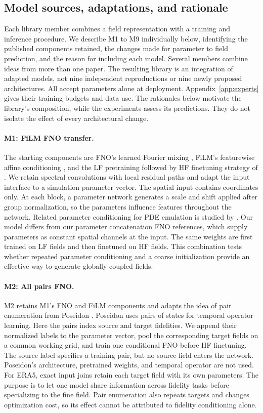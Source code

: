 \subsection{Model sources, adaptations, and rationale}
\label{app:adaptations}
Each library member combines a field representation with a training and inference
procedure. We describe M1 to M9 individually below, identifying the published
components retained, the changes made for parameter to field prediction, and
the reason for including each model. Several members combine ideas from more
than one paper. The resulting library is an integration of adapted models,
not nine independent reproductions or nine newly proposed architectures.
All accept parameters alone at deployment. Appendix~\ref{app:experts} gives
their training budgets and data use. The rationales below motivate the library's
composition, while the experiments assess its predictions. They do not isolate
the effect of every architectural change.

\paragraph{M1: FiLM FNO transfer.}
The starting components are FNO's learned Fourier mixing \citep{li2021fno},
FiLM's featurewise affine conditioning \citep{perez2018}, and the LF pretraining
followed by HF finetuning strategy of \citet{lyu2023}. We retain spectral
convolutions with local residual paths and adapt the input interface to a
simulation parameter vector. The spatial input contains coordinates only.
At each block, a parameter network generates a scale and shift applied after
group normalization, so the parameters influence features throughout the
network. Related parameter conditioning for PDE emulation is studied by
\citet{shokar2025}. Our model differs from our parameter concatenation FNO references, which
supply parameters as constant spatial channels at the input. The same weights
are first trained on LF fields and then finetuned on HF fields. This combination
tests whether repeated parameter conditioning and a coarse initialization
provide an effective way to generate globally coupled fields.

\paragraph{M2: All pairs FNO.}
M2 retains M1's FNO and FiLM components \citep{li2021fno,perez2018} and adapts
the idea of pair enumeration from Poseidon \citep{herde2024}. Poseidon uses
pairs of states for temporal operator learning. Here the pairs index source
and target fidelities. We append their normalized labels to the parameter
vector, pool the corresponding target fields on a common working grid, and
train one conditional FNO before HF finetuning. The source label specifies a
training pair, but no source field enters the network. Poseidon's architecture,
pretrained weights, and temporal operator are not used. For ERA5, exact input
joins retain each target field with its own parameters. The purpose is to let
one model share information across fidelity tasks before specializing to the
fine field. Pair enumeration also repeats targets and changes optimization
cost, so its effect cannot be attributed to fidelity conditioning alone.

